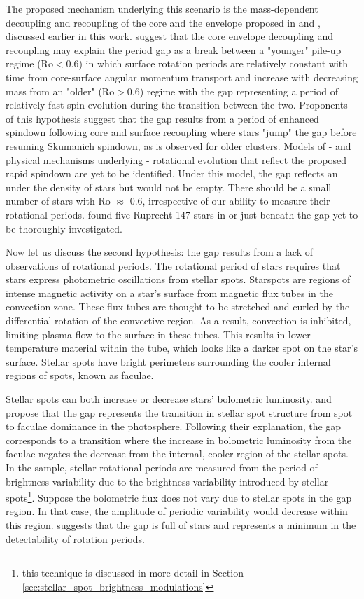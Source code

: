 The proposed mechanism underlying this scenario is the mass-dependent decoupling and recoupling of the core and the envelope proposed in 
\citet{lanzafame_rotational_2015} and \citet{spada_competing_2020}, discussed earlier in this work.
\citet{angus_exploring_2020} suggest that the core envelope decoupling and recoupling may explain the period gap as a break between a "younger" pile-up regime (Ro$<$0.6) in which surface rotation periods are relatively constant with time from core-surface angular momentum transport and increase with decreasing mass from an "older" (Ro$>$0.6) regime with the gap representing a period of relatively fast spin evolution during the transition between the two.
Proponents of this hypothesis suggest that the gap results from a period of enhanced spindown following core and surface recoupling where stars "jump" the gap before resuming Skumanich spindown, as is observed for older clusters.
Models of - and physical mechanisms underlying - rotational evolution that reflect the proposed rapid spindown are yet to be identified.
Under this model, the gap reflects an under the density of stars but would not be empty.
There should be a small number of stars with Ro $\approx$ 0.6, irrespective of our ability to measure their rotational periods.
\citet{curtis_when_2020} found five Ruprecht 147 stars in or just beneath the gap yet to be thoroughly investigated.

Now let us discuss the second hypothesis: the gap results from a lack of observations of rotational periods.
The rotational period of \kepler{} stars requires that stars express photometric oscillations from stellar spots.
Starspots are regions of intense magnetic activity on a star's surface from magnetic flux tubes in the convection zone. 
These flux tubes are thought to be stretched and curled by the differential rotation of the convective region. 
As a result, convection is inhibited, limiting plasma flow to the surface in these tubes.
This results in lower-temperature material within the tube, which looks like a darker spot on the star's surface.
Stellar spots have bright perimeters surrounding the cooler internal regions of spots, known as faculae.

Stellar spots can both increase or decrease stars' bolometric luminosity.
 \citet{reinhold_fast_2013} and \citet{reinhold_transition_2019} propose that the gap represents the transition in stellar spot structure from spot to faculae dominance in the photosphere.
Following their explanation, the gap corresponds to a transition where the increase in bolometric luminosity from the faculae negates the decrease from the internal, cooler region of the stellar spots. 
In the \citet{mcquillan_rotation_2014} sample, stellar rotational periods are measured from the period of brightness variability due to the brightness variability introduced by stellar spots\footnote{this technique is discussed in more detail in Section \ref{sec:stellar_spot_brightness_modulations}}.
Suppose the bolometric flux does not vary due to stellar spots in the gap region. 
In that case, the amplitude of periodic variability would decrease within this region.
\citet{reinhold_transition_2019} suggests that the gap is full of stars and represents a minimum in the detectability of rotation periods.

